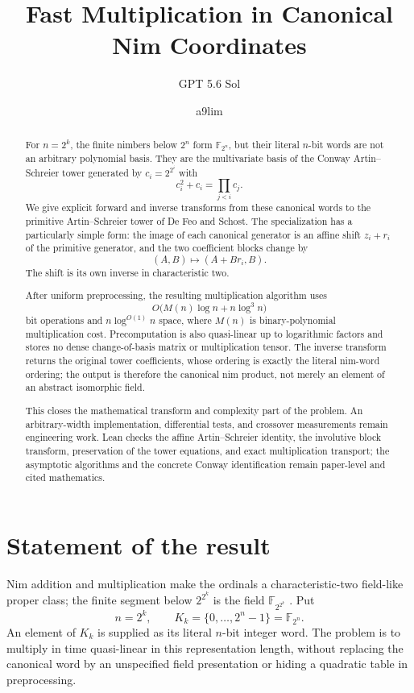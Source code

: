 \documentclass[11pt]{article}
\title{Fast Multiplication in Canonical Nim Coordinates}
\author{GPT 5.6 Sol \and a9lim}
\date{}
\theoremstyle{definition}
\theoremstyle{remark}
\newcommand{\F}{\mathbb F}
\begin{document}
\maketitle

\begin{abstract}
For $n=2^k$, the finite nimbers below $2^n$ form $\F_{2^n}$, but their
literal $n$-bit words are not an arbitrary polynomial basis.  They are the
multivariate basis of the Conway Artin--Schreier tower generated by
$c_i=2^{2^i}$ with
\[
  c_i^2+c_i=\prod_{j<i}c_j.
\]
We give explicit forward and inverse transforms from these canonical words to
the primitive Artin--Schreier tower of De Feo and Schost.  The specialization
has a particularly simple form: the image of each canonical generator is an
affine shift $z_i+r_i$ of the primitive generator, and the two coefficient
blocks change by
\[
  (A,B)\longmapsto(A+Br_i,B).
\]
The shift is its own inverse in characteristic two.

After uniform preprocessing, the resulting multiplication algorithm uses
\[
  O\bigl(M(n)\log n+n\log^3 n\bigr)
\]
bit operations and $n\log^{O(1)}n$ space, where $M(n)$ is binary-polynomial
multiplication cost.  Precomputation is also quasi-linear up to logarithmic
factors and stores no dense change-of-basis matrix or multiplication tensor.
The inverse transform returns the original tower coefficients, whose ordering
is exactly the literal nim-word ordering; the output is therefore the
canonical nim product, not merely an element of an abstract isomorphic field.

This closes the mathematical transform and complexity part of the problem.
An arbitrary-width implementation, differential tests, and crossover
measurements remain engineering work.  Lean checks the affine
Artin--Schreier identity, the involutive block transform, preservation of the
tower equations, and exact multiplication transport; the asymptotic
algorithms and the concrete Conway identification remain paper-level and
cited mathematics.
\end{abstract}

\section{Statement of the result}

Nim addition and multiplication make the ordinals a characteristic-two
field-like proper class; the finite segment below $2^{2^k}$ is the field
$\F_{2^{2^k}}$ \cite{conway1976,lenstra1978}.  Put
\[
  n=2^k,
  \qquad
  K_k=\{0,\ldots,2^n-1\}=\F_{2^n}.
\]
An element of $K_k$ is supplied as its literal $n$-bit integer word.  The
problem is to multiply in time quasi-linear in this representation length,
without replacing the canonical word by an unspecified field presentation or
hiding a quadratic table in preprocessing.
\end{document}
